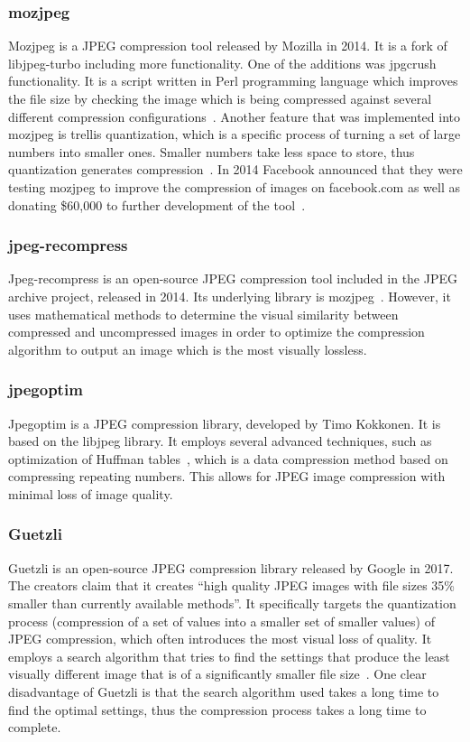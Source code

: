 \documentclass[12pt]{article}
\begin{document}
\subsubsection{mozjpeg} \label{mozjpeg}
Mozjpeg is a JPEG compression tool released by Mozilla in 2014. It is a fork of libjpeg-turbo including more functionality. One of the additions was jpgcrush functionality. It is a script written in Perl programming language which improves the file size by checking the image which is being compressed against several different compression configurations~\cite{mozjpeg1}. Another feature that was implemented into mozjpeg is trellis quantization, which is a specific process of turning a set of large numbers into smaller ones. Smaller numbers take less space to store, thus quantization generates compression~\cite{HandbookofDataCompression}. In 2014 Facebook announced that they were testing mozjpeg to improve the compression of images on facebook.com as well as donating \$60,000 to further development of the tool~\cite{mozjpeg2}.

\subsubsection{jpeg-recompress} \label{jpeg-recompress}
Jpeg-recompress is an open-source JPEG compression tool included in the JPEG archive project, released in 2014. Its underlying library is mozjpeg~\cite{jpeg-archive}. However, it uses mathematical methods to determine the visual similarity between compressed and uncompressed images in order to optimize the compression algorithm to output an image which is the most visually lossless.

\subsubsection{jpegoptim} \label{jpegoptim}
Jpegoptim is a JPEG compression library, developed by Timo Kokkonen. It is based on the libjpeg library. It employs several advanced techniques, such as optimization of Huffman tables~\cite{jpegoptim}, which is a data compression method based on compressing repeating numbers. This allows for JPEG image compression with minimal loss of image quality.

\subsubsection{Guetzli} \label{guetzli}
Guetzli is an open-source JPEG compression library released by Google in 2017. The creators claim that it creates ``high quality JPEG images with file sizes 35\% smaller than currently available methods''. It specifically targets the quantization process (compression of a set of values into a smaller set of smaller values) of JPEG compression, which often introduces the most visual loss of quality. It employs a search algorithm that tries to find the settings that produce the least visually different image that is of a significantly smaller file size~\cite{guetzli}. One clear disadvantage of Guetzli is that the search algorithm used takes a long time to find the optimal settings, thus the compression process takes a long time to complete.
\end{document}
